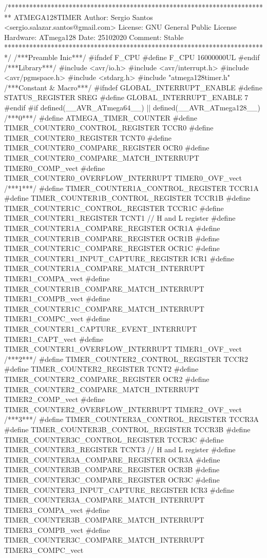 \begin{verbatimtab}
/*************************************************************************
ATMEGA128TIMER
Author: Sergio Santos 
<sergio.salazar.santos@gmail.com>
License: GNU General Public License
Hardware: ATmega128
Date: 25102020
Comment:
Stable
*************************************************************************/
/***Preamble Inic***/
#ifndef F_CPU
#define F_CPU 16000000UL
#endif
/***Library***/
#include <avr/io.h>
#include <avr/interrupt.h>
#include <avr/pgmspace.h>
#include <stdarg.h>
#include "atmega128timer.h"
/***Constant & Macro***/
#ifndef GLOBAL_INTERRUPT_ENABLE
#define STATUS_REGISTER SREG
#define GLOBAL_INTERRUPT_ENABLE 7
#endif
#if defined(__AVR_ATmega64__) || defined(__AVR_ATmega128__)
/***0***/
#define ATMEGA_TIMER_COUNTER
#define TIMER_COUNTER0_CONTROL_REGISTER TCCR0
#define TIMER_COUNTER0_REGISTER TCNT0
#define TIMER_COUNTER0_COMPARE_REGISTER OCR0
#define TIMER_COUNTER0_COMPARE_MATCH_INTERRUPT TIMER0_COMP_vect
#define TIMER_COUNTER0_OVERFLOW_INTERRUPT TIMER0_OVF_vect
/***1***/
#define TIMER_COUNTER1A_CONTROL_REGISTER TCCR1A
#define TIMER_COUNTER1B_CONTROL_REGISTER TCCR1B
#define TIMER_COUNTER1C_CONTROL_REGISTER TCCR1C
#define TIMER_COUNTER1_REGISTER TCNT1 // H and L register
#define TIMER_COUNTER1A_COMPARE_REGISTER OCR1A
#define TIMER_COUNTER1B_COMPARE_REGISTER OCR1B
#define TIMER_COUNTER1C_COMPARE_REGISTER OCR1C
#define TIMER_COUNTER1_INPUT_CAPTURE_REGISTER ICR1
#define TIMER_COUNTER1A_COMPARE_MATCH_INTERRUPT TIMER1_COMPA_vect
#define TIMER_COUNTER1B_COMPARE_MATCH_INTERRUPT TIMER1_COMPB_vect
#define TIMER_COUNTER1C_COMPARE_MATCH_INTERRUPT TIMER1_COMPC_vect
#define TIMER_COUNTER1_CAPTURE_EVENT_INTERRUPT TIMER1_CAPT_vect
#define TIMER_COUNTER1_OVERFLOW_INTERRUPT TIMER1_OVF_vect
/***2***/
#define TIMER_COUNTER2_CONTROL_REGISTER TCCR2
#define TIMER_COUNTER2_REGISTER TCNT2
#define TIMER_COUNTER2_COMPARE_REGISTER OCR2
#define TIMER_COUNTER2_COMPARE_MATCH_INTERRUPT TIMER2_COMP_vect
#define TIMER_COUNTER2_OVERFLOW_INTERRUPT TIMER2_OVF_vect
/***3***/
#define TIMER_COUNTER3A_CONTROL_REGISTER TCCR3A
#define TIMER_COUNTER3B_CONTROL_REGISTER TCCR3B
#define TIMER_COUNTER3C_CONTROL_REGISTER TCCR3C
#define TIMER_COUNTER3_REGISTER TCNT3 // H and L register
#define TIMER_COUNTER3A_COMPARE_REGISTER OCR3A
#define TIMER_COUNTER3B_COMPARE_REGISTER OCR3B
#define TIMER_COUNTER3C_COMPARE_REGISTER OCR3C
#define TIMER_COUNTER3_INPUT_CAPTURE_REGISTER ICR3
#define TIMER_COUNTER3A_COMPARE_MATCH_INTERRUPT TIMER3_COMPA_vect
#define TIMER_COUNTER3B_COMPARE_MATCH_INTERRUPT TIMER3_COMPB_vect
#define TIMER_COUNTER3C_COMPARE_MATCH_INTERRUPT TIMER3_COMPC_vect

\end{verbatimtab}
